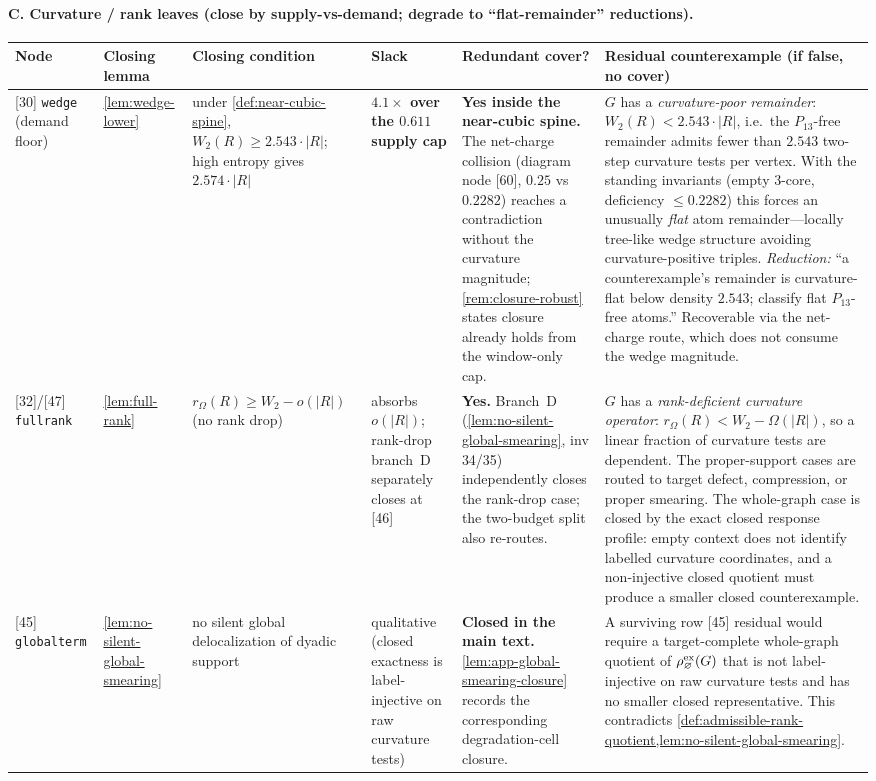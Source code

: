 \documentclass[11pt]{article}
\begin{document}
\paragraph{C. Curvature / rank leaves (close by supply-vs-demand; degrade to ``flat-remainder'' reductions).}
{\scriptsize\setlength{\tabcolsep}{3pt}
\begin{longtable}{L{0.09\textwidth} L{0.095\textwidth} L{0.15\textwidth} L{0.08\textwidth} L{0.105\textwidth} L{0.335\textwidth}}
\toprule
\textbf{Node} & \textbf{Closing lemma} & \textbf{Closing condition} & \textbf{Slack} & \textbf{Redundant cover?} & \textbf{Residual counterexample (if false, no cover)} \\
\midrule
\endhead
{[30]} \texttt{wedge} (demand floor) & \cref{lem:wedge-lower} & under \cref{def:near-cubic-spine}, $W_2(R)\ge2.543\cdot|R|$; high entropy gives $2.574\cdot|R|$ & \textbf{$4.1\times$ over the $0.611$ supply cap} & \textbf{Yes inside the near-cubic spine.} The net-charge collision (diagram node {[60]}, $0.25$ vs $0.2282$) reaches a contradiction without the curvature magnitude; \cref{rem:closure-robust} states closure already holds from the window-only cap. & $G$ has a \emph{curvature-poor remainder}: $W_2(R)<2.543\cdot|R|$, i.e.\ the $P_{13}$-free remainder admits fewer than $2.543$ two-step curvature tests per vertex. With the standing invariants (empty $3$-core, deficiency $\le0.2282$) this forces an unusually \emph{flat} atom remainder---locally tree-like wedge structure avoiding curvature-positive triples. \emph{Reduction:} ``a counterexample's remainder is curvature-flat below density $2.543$; classify flat $P_{13}$-free atoms.'' Recoverable via the net-charge route, which does not consume the wedge magnitude. \\
{[32]}/{[47]} \texttt{fullrank} & \cref{lem:full-rank} & $r_\Omega(R)\ge W_2-o(|R|)$ (no rank drop) & absorbs $o(|R|)$; rank-drop branch~D separately closes at {[46]} & \textbf{Yes.} Branch~D (\cref{lem:no-silent-global-smearing}, inv 34/35) independently closes the rank-drop case; the two-budget split also re-routes. & $G$ has a \emph{rank-deficient curvature operator}: $r_\Omega(R)<W_2-\Omega(|R|)$, so a linear fraction of curvature tests are dependent. The proper-support cases are routed to target defect, compression, or proper smearing. The whole-graph case is closed by the exact closed response profile: empty context does not identify labelled curvature coordinates, and a non-injective closed quotient must produce a smaller closed counterexample. \\
{[45]} \texttt{globalterm} & \cref{lem:no-silent-global-smearing} & no silent global delocalization of dyadic support & qualitative (closed exactness is label-injective on raw curvature tests) & \textbf{Closed in the main text.} \cref{lem:app-global-smearing-closure} records the corresponding degradation-cell closure. & A surviving row {[45]} residual would require a target-complete whole-graph quotient of $\rho_\varnothing^{\rm ex}(G)$ that is not label-injective on raw curvature tests and has no smaller closed representative. This contradicts \cref{def:admissible-rank-quotient,lem:no-silent-global-smearing}. \\

\end{longtable}}
\end{document}
